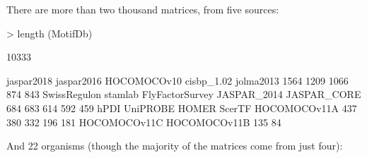 \documentclass{article}
\renewenvironment{Schunk}{\vspace{\topsep}}{\vspace{\topsep}}
\begin{document}
There are  more than two thousand  matrices, from five sources:
\begin{Schunk}
\begin{Sinput}
> length (MotifDb)
\end{Sinput}
\begin{Soutput}
[1] 10333
\end{Soutput}
\begin{Soutput}
     jaspar2018      jaspar2016     HOCOMOCOv10      cisbp_1.02       jolma2013 
           1564            1209            1066             874             843 
   SwissRegulon         stamlab FlyFactorSurvey     JASPAR_2014     JASPAR_CORE 
            684             683             614             592             459 
           hPDI        UniPROBE           HOMER          ScerTF    HOCOMOCOv11A 
            437             380             332             196             181 
   HOCOMOCOv11C    HOCOMOCOv11B 
            135              84 
\end{Soutput}
\end{Schunk}
And 22 organisms (though the majority of the matrices come from just four):
\end{document}
